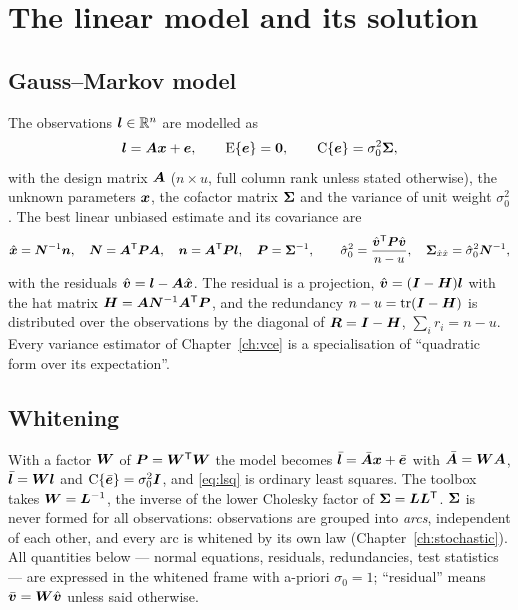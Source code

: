 \chapter{The linear model and its solution}\label{ch:model}

\section{Gauss--Markov model}

The observations $\bm{l}\in\mathbb R^n$ are modelled as
\begin{equation}\label{eq:gm}
\bm{l} = \bm{A}\bm{x} + \bm{e},\qquad \operatorname{E}\{\bm{e}\}=\bm{0},\qquad \mathrm{C}\{\bm{e}\}=\sigma_0^2\bm{\Sigma} ,
\end{equation}
with the design matrix $\bm{A}$ ($n\times u$, full column rank unless stated otherwise), the
unknown parameters $\bm{x}$, the cofactor matrix $\bm{\Sigma}$ and the variance of unit weight
$\sigma_0^2$. The best linear unbiased estimate and its covariance are
\begin{equation}\label{eq:lsq}
\hat{\bm{x}}=\bm{N}^{-1}\bm{n},\quad \bm{N}=\bm{A}^{\mathsf T}\bm{P}\bm{A},\quad \bm{n}=\bm{A}^{\mathsf T}\bm{P}\bm{l},\quad
\bm{P}=\bm{\Sigma}^{-1},\qquad
\hat\sigma_0^2=\frac{\hat{\bm{v}}^{\mathsf T}\bm{P}\hat{\bm{v}}}{n-u},\quad
\bm{\Sigma}_{\hat x\hat x}=\hat\sigma_0^2\bm{N}^{-1},
\end{equation}
with the residuals $\hat{\bm{v}}=\bm{l}-\bm{A}\hat{\bm{x}}$. The residual is a projection,
$\hat{\bm{v}}=(\bm{I}-\bm{H})\bm{l}$ with the hat matrix $\bm{H}=\bm{A}\bm{N}^{-1}\bm{A}^{\mathsf T}\bm{P}$, and
the redundancy $n-u=\operatorname{tr}(\bm{I}-\bm{H})$ is distributed over the observations by the diagonal of
$\bm{R}=\bm{I}-\bm{H}$, $\sum_i r_i=n-u$. Every variance estimator of Chapter~\ref{ch:vce} is a
specialisation of ``quadratic form over its expectation''.

\section{Whitening}\label{sec:whiten}

With a factor $\bm{W}$ of $\bm{P}=\bm{W}^{\mathsf T}\bm{W}$ the model becomes
$\bar{\bm{l}}=\bar{\bm{A}}\bm{x}+\bar{\bm{e}}$ with $\bar{\bm{A}}=\bm{W}\bm{A}$, $\bar{\bm{l}}=\bm{W}\bm{l}$ and
$\mathrm C\{\bar{\bm{e}}\}=\sigma_0^2\bm{I}$, and \eqref{eq:lsq} is ordinary least squares. The
toolbox takes $\bm{W}=\bm{L}^{-1}$, the inverse of the lower Cholesky factor of
$\bm{\Sigma}=\bm{L}\bm{L}^{\mathsf T}$. $\bm{\Sigma}$ is never formed for all observations: observations are
grouped into \emph{arcs}, independent of each other, and every arc is whitened by its own law
(Chapter~\ref{ch:stochastic}). All quantities below --- normal equations, residuals,
redundancies, test statistics --- are expressed in the whitened frame with a-priori
$\sigma_0=1$; ``residual'' means $\bar{\bm{v}}=\bm{W}\hat{\bm{v}}$ unless said otherwise.

